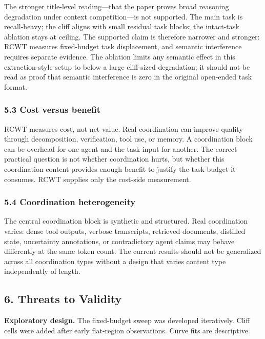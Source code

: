 \documentclass[
  runningheads]{llncs}
\begin{document}
The stronger title-level reading---that the paper proves broad reasoning
degradation under context competition---is not supported. The main task
is recall-heavy; the cliff aligns with small residual task blocks; the
intact-task ablation stays at ceiling. The supported claim is therefore
narrower and stronger: RCWT measures fixed-budget task displacement, and
semantic interference requires separate evidence. The ablation limits
any semantic effect in this extraction-style setup to below a large
cliff-sized degradation; it should not be read as proof that semantic
interference is zero in the original open-ended task format.

\subsubsection{5.3 Cost versus benefit}\label{cost-versus-benefit}

RCWT measures cost, not net value. Real coordination can improve quality
through decomposition, verification, tool use, or memory. A coordination
block can be overhead for one agent and the task input for another. The
correct practical question is not whether coordination hurts, but
whether this coordination content provides enough benefit to justify the
task-budget it consumes. RCWT supplies only the cost-side measurement.

\subsubsection{5.4 Coordination
heterogeneity}\label{coordination-heterogeneity}

The central coordination block is synthetic and structured. Real
coordination varies: dense tool outputs, verbose transcripts, retrieved
documents, distilled state, uncertainty annotations, or contradictory
agent claims may behave differently at the same token count. The current
results should not be generalized across all coordination types without
a design that varies content type independently of length.

\subsection{6. Threats to Validity}\label{threats-to-validity}

\textbf{Exploratory design.} The fixed-budget sweep was developed
iteratively. Cliff cells were added after early flat-region
observations. Curve fits are descriptive.
\end{document}
